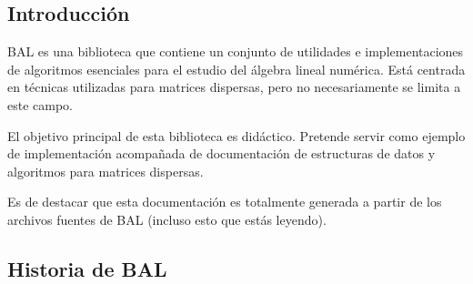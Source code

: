 \hypertarget{index_introsec}{}\subsection{Introducción}\label{index_introsec}
BAL es una biblioteca que contiene un conjunto de utilidades e implementaciones de algoritmos esenciales para el estudio del álgebra lineal numérica. Está centrada en técnicas utilizadas para matrices dispersas, pero no necesariamente se limita a este campo.

El objetivo principal de esta biblioteca es didáctico. Pretende servir como ejemplo de implementación acompañada de documentación de estructuras de datos y algoritmos para matrices dispersas.

Es de destacar que esta documentación es totalmente generada a partir de los archivos fuentes de BAL (incluso esto que estás leyendo).\hypertarget{index_historysec}{}\subsection{Historia de BAL}\label{index_historysec}
